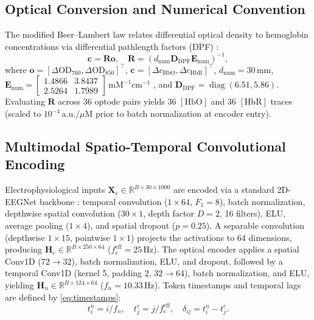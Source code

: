 \documentclass[journal]{IEEEtran}
\begin{document}
\subsection{Optical Conversion and Numerical Convention}
The modified Beer--Lambert law relates differential optical density to hemoglobin concentrations via differential pathlength factors (DPF) \cite{delpy1988estimation}:
\begin{equation}
\mathbf{c} = \mathbf{R} \mathbf{o}, \quad \mathbf{R} = (d_{\mathrm{num}}\mathbf{D}_{\mathrm{DPF}}\mathbf{E}_{\mathrm{num}})^{-1},
\label{eq:mbll}
\end{equation}
where $\mathbf{o} = [\Delta\mathrm{OD}_{760}, \Delta\mathrm{OD}_{850}]^\top$, $\mathbf{c} = [\Delta c_{\mathrm{HbO}}, \Delta c_{\mathrm{HbR}}]^\top$, $d_{\mathrm{num}} = 30$\,mm, $\mathbf{E}_{\mathrm{num}} = \left[\begin{smallmatrix}1.4866 & 3.8437 \\ 2.5264 & 1.7989\end{smallmatrix}\right]$\,$\mathrm{mM}^{-1}\mathrm{cm}^{-1}$ \cite{delpy1988estimation}, and $\mathbf{D}_{\mathrm{DPF}} = \operatorname{diag}(6.51, 5.86)$. Evaluating $\mathbf{R}$ across 36 optode pairs yields 36 $[\mathrm{HbO}]$ and 36 $[\mathrm{HbR}]$ traces (scaled to $10^{-4}\,\mathrm{a.u.}/\mu\mathrm{M}$ prior to batch normalization at encoder entry).

\subsection{Multimodal Spatio-Temporal Convolutional Encoding}
Electrophysiological inputs $\mathbf{X}_e \in \mathbb{R}^{B \times 30 \times 1000}$ are encoded via a standard 2D-EEGNet backbone \cite{lawhern2018eegnet}: temporal convolution ($1 \times 64$, $F_1 = 8$), batch normalization, depthwise spatial convolution ($30 \times 1$, depth factor $D = 2$, 16 filters), ELU, average pooling ($1 \times 4$), and spatial dropout ($p = 0.25$). A separable convolution (depthwise $1 \times 15$, pointwise $1 \times 1$) projects the activations to 64 dimensions, producing $\mathbf{H}_e \in \mathbb{R}^{B \times 250 \times 64}$ ($f_e^{\mathrm{eff}} = 25$\,Hz). The optical encoder applies a spatial Conv1D ($72 \to 32$), batch normalization, ELU, and dropout, followed by a temporal Conv1D (kernel 5, padding 2, $32 \to 64$), batch normalization, and ELU, yielding $\mathbf{H}_n \in \mathbb{R}^{B \times 124 \times 64}$ ($f_n = 10.33$\,Hz). Token timestamps and temporal lags are defined by \eqref{eq:timestamps}:
\begin{equation}
t_i^n = i / f_n, \quad t_j^e = j / f_e^{\mathrm{eff}}, \quad \delta_{ij} = t_i^n - t_j^e.
\label{eq:timestamps}
\end{equation}
\end{document}
